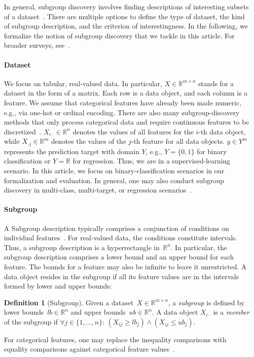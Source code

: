 \documentclass{article}
\theoremstyle{definition}
\newtheorem{definition}{Definition}
\begin{document}
In general, subgroup discovery involves finding descriptions of interesting subsets of a dataset~\cite{atzmueller2015subgroup}.
There are multiple options to define the type of dataset, the kind of subgroup description, and the criterion of interestingness.
In the following, we formalize the notion of subgroup discovery that we tackle in this article.
For broader surveys, see~\cite{atzmueller2015subgroup, helal2016subgroup, herrera2011overview, ventura2018subgroup}.

\paragraph{Dataset}

We focus on tabular, real-valued data.
In particular, $X \in \mathbb{R}^{m \times n}$ stands for a dataset in the form of a matrix.
Each row is a data object, and each column is a feature.
We assume that categorical features have already been made numeric, e.g., via one-hot or ordinal encoding.
There are also many subgroup-discovery methods that only process categorical data and require continuous features to be discretized~\cite{herrera2011overview, meeng2021real}.
$X_{i \cdot} \in \mathbb{R}^n$ denotes the values of all features for the $i$-th data object,
while $X_{\cdot j} \in \mathbb{R}^m$ denotes the values of the $j$-th feature for all data objects.
$y \in Y^m$ represents the prediction target with domain $Y$, e.g., $Y=\{0,1\}$ for binary classification or $Y=\mathbb{R}$ for regression.
Thus, we are in a supervised-learning scenario.
In this article, we focus on binary-classification scenarios in our formalization and evaluation.
In general, one may also conduct subgroup discovery in multi-class, multi-target, or regression scenarios~\cite{atzmueller2015subgroup}.

\paragraph{Subgroup}

A Subgroup description typically comprises a conjunction of conditions on individual features~\cite{meeng2021real}.
For real-valued data, the conditions constitute intervals.
Thus, a subgroup description is a hyperrectangle in~$\mathbb{R}^n$.
In particular, the subgroup description comprises a lower bound and an upper bound for each feature.
The bounds for a feature may also be infinite to leave it unrestricted.
A data object resides in the subgroup if all its feature values are in the intervals formed by lower and upper bounds:
%
\begin{definition}[Subgroup]
	Given a dataset~$X \in \mathbb{R}^{m \times n}$, a \emph{subgroup} is defined by lower bounds~$\mathit{lb} \in \mathbb{R}^n$ and upper bounds~$\mathit{ub} \in \mathbb{R}^n$.
	A data object $X_{i \cdot}$ is a \emph{member} of the subgroup if $\forall j \in \{1, \dots, n\}:~ \left( X_{ij} \geq \mathit{lb}_j \right) \land \left( X_{ij} \leq \mathit{ub}_j \right)$.
	\label{def:csd:subgroup}
\end{definition}
%
For categorical features, one may replace the inequality comparisons with equality comparisons against categorical feature values~\cite{atzmueller2015subgroup}.
\end{document}
